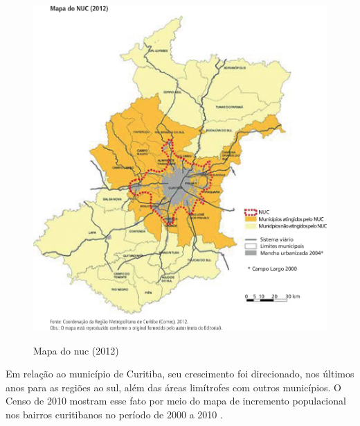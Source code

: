 	\begin{figure}
		\centering
		\caption{Mapa do \gls{nuc} (2012)}
		\includegraphics[width=1.0\linewidth]{img/costa2015a_03}
		\label{fig:costa2015a_03}
	\end{figure}
    
	Em relação ao município de Curitiba, seu crescimento foi direcionado, nos últimos anos para as regiões ao sul, além das áreas limítrofes com outros municípios. O Censo de 2010 mostram esse fato por meio do mapa de incremento populacional nos bairros curitibanos no período de 2000 a 2010 \cite[p. 11]{costa2015a}.
    
